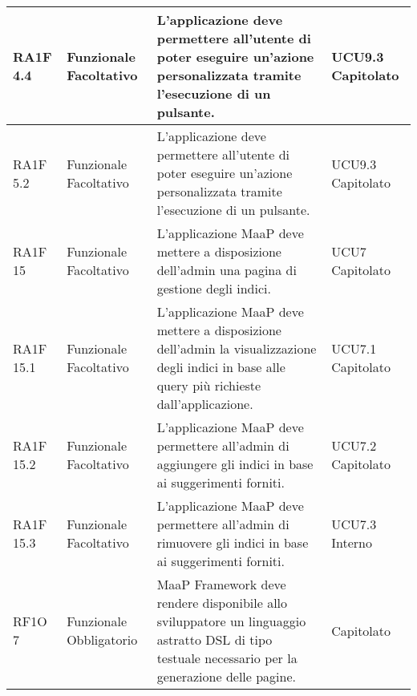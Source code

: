 \begin{center}
\begin{longtable}{ | l | p{2cm} | p{5cm} | p{1.7cm} |}
        RA1F 4.4 & Funzionale \newline  Facoltativo  & L'applicazione deve permettere all'utente di poter eseguire un'azione personalizzata tramite l'esecuzione di un pulsante. &  UCU9.3 \newline  Capitolato \newline  \\ \hline      
        RA1F 5.2 & Funzionale \newline  Facoltativo  & L'applicazione deve permettere all'utente di poter eseguire un'azione personalizzata tramite l'esecuzione di un pulsante. &  UCU9.3 \newline  Capitolato \newline  \\ \hline      
        RA1F 15 & Funzionale \newline  Facoltativo  & L'applicazione MaaP deve mettere a disposizione dell'admin una pagina di gestione degli indici. &  UCU7 \newline  Capitolato \newline  \\ \hline      
        RA1F 15.1 & Funzionale \newline  Facoltativo  & L'applicazione MaaP deve mettere a disposizione dell'admin la visualizzazione degli indici in base alle query più richieste dall'applicazione. &  UCU7.1 \newline  Capitolato \newline  \\ \hline      
        RA1F 15.2 & Funzionale \newline  Facoltativo  & L'applicazione MaaP deve permettere all'admin di aggiungere gli indici in base ai suggerimenti forniti. &  UCU7.2 \newline  Capitolato \newline  \\ \hline      
        RA1F 15.3 & Funzionale \newline  Facoltativo  & L'applicazione MaaP deve permettere all'admin di rimuovere gli indici in base ai suggerimenti forniti. &  UCU7.3 \newline  Interno \newline  \\ \hline      
        RF1O 7 & Funzionale \newline  Obbligatorio  & MaaP Framework deve rendere disponibile allo sviluppatore un linguaggio astratto DSL di tipo testuale necessario per la generazione delle pagine. &  Capitolato \newline  \\ \hline      

\end{longtable}
\end{center}
